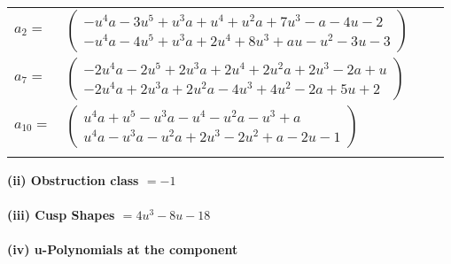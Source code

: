 \documentclass[1p]{elsarticle_modified}
\theoremstyle{definition}
\begin{document}
\begin{tabular}{m{7pt} m{180pt} m{7pt} m{180pt} }
\flushright $a_{2}=$&$\begin{pmatrix}- u^4 a-3 u^5+u^3 a+u^4+u^2 a+7 u^3- a-4 u-2\\- u^4 a-4 u^5+u^3 a+2 u^4+8 u^3+a u- u^2-3 u-3\end{pmatrix}$ \\
\flushright $a_{7}=$&$\begin{pmatrix}-2 u^4 a-2 u^5+2 u^3 a+2 u^4+2 u^2 a+2 u^3-2 a+u\\-2 u^4 a+2 u^3 a+2 u^2 a-4 u^3+4 u^2-2 a+5 u+2\end{pmatrix}$ \\
\flushright $a_{10}=$&$\begin{pmatrix}u^4 a+u^5- u^3 a- u^4- u^2 a- u^3+a\\u^4 a- u^3 a- u^2 a+2 u^3-2 u^2+a-2 u-1\end{pmatrix}$\\&\end{tabular}
\flushleft \textbf{(ii) Obstruction class $= -1$}\\~\\
\flushleft \textbf{(iii) Cusp Shapes $= 4 u^3-8 u-18$}\\~\\
\newpage\renewcommand{\arraystretch}{1}
\flushleft \textbf{(iv) u-Polynomials at the component}\newline \\
\end{document}
